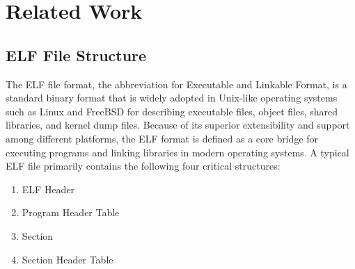 %
%
%
%
%

\chapter{Related Work}
\section{ELF File Structure}

The ELF file format, the abbreviation for Executable and Linkable Format, is a standard binary format that is widely adopted in Unix-like operating systems such as Linux and FreeBSD for describing executable files, object files, shared libraries, and kernel dump files. Because of its superior extensibility and support among different platforms, the ELF format is defined as a core bridge for executing programs and linking libraries in modern operating systems. A typical ELF file primarily contains the following four critical structures:

\begin{enumerate} [label=\arabic*)] 
\item ELF Header

\item Program Header Table

\item Section

\item Section Header Table

\end{enumerate}

